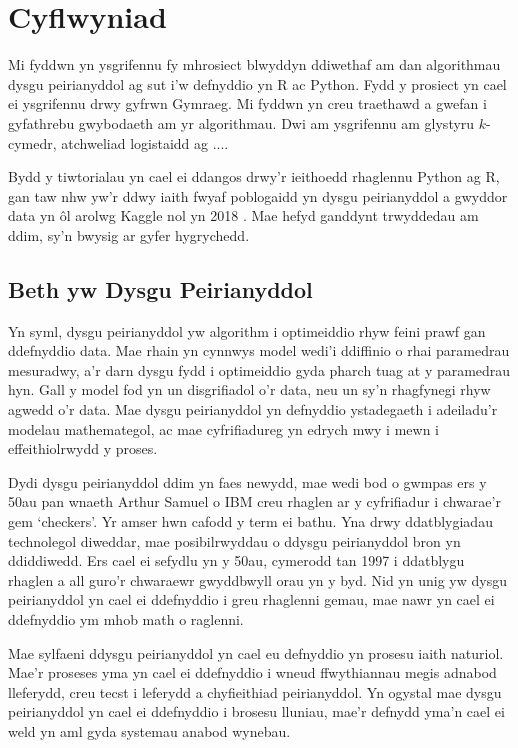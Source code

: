 \chapter{Cyflwyniad}\label{cha:introduction}

Mi fyddwn yn ysgrifennu fy mhrosiect blwyddyn ddiwethaf am dan algorithmau dysgu peirianyddol ag sut i'w defnyddio yn R ac Python. Fydd y prosiect yn cael ei ysgrifennu drwy gyfrwn Gymraeg. Mi fyddwn yn creu traethawd a gwefan i gyfathrebu gwybodaeth am yr algorithmau. Dwi am ysgrifennu am glystyru $k$-cymedr, atchweliad logistaidd ag ....

Bydd y tiwtorialau yn cael ei ddangos drwy'r ieithoedd rhaglennu Python ag R, gan taw nhw yw'r ddwy iaith fwyaf poblogaidd yn dysgu peirianyddol a gwyddor data yn \^{o}l arolwg Kaggle nol yn 2018 \cite{kagglesurvey}. Mae hefyd ganddynt trwyddedau am ddim, sy'n bwysig ar gyfer hygrychedd.

\section{Beth yw Dysgu Peirianyddol}\label{sec:intro_pd}

Yn syml, dysgu peirianyddol yw algorithm i optimeiddio rhyw feini prawf gan ddefnyddio data. Mae rhain yn cynnwys model wedi'i ddiffinio o rhai paramedrau mesuradwy, a'r darn dysgu fydd i optimeiddio gyda pharch tuag at y paramedrau hyn. Gall y model fod yn un disgrifiadol o'r data, neu un sy'n rhagfynegi rhyw agwedd o'r data. Mae dysgu peirianyddol yn defnyddio ystadegaeth i adeiladu'r modelau mathemategol, ac mae cyfrifiadureg yn edrych mwy i mewn i effeithiolrwydd y proses.\cite{dysgu-peirianyddol2}

Dydi dysgu peirianyddol ddim yn faes newydd, mae wedi bod o gwmpas ers y 50au pan wnaeth Arthur Samuel o IBM creu rhaglen ar y cyfrifiadur i chwarae'r gem `checkers'. Yr amser hwn cafodd y term ei bathu. Yna drwy ddatblygiadau technolegol diweddar, mae posibilrwyddau o ddysgu peirianyddol bron yn ddiddiwedd. Ers cael ei sefydlu yn y 50au, cymerodd tan 1997 i ddatblygu rhaglen a all guro'r chwaraewr gwyddbwyll orau yn y byd. Nid yn unig yw dysgu peirianyddol yn cael ei ddefnyddio i greu rhaglenni gemau, mae nawr yn cael ei ddefnyddio ym mhob math o raglenni. %

Mae sylfaeni ddysgu peirianyddol yn cael eu defnyddio yn prosesu iaith naturiol. Mae'r proseses yma yn cael ei ddefnyddio i wneud ffwythiannau megis adnabod lleferydd, creu tecst i leferydd a chyfieithiad peirianyddol.
Yn ogystal mae dysgu peirianyddol yn cael ei ddefnyddio i brosesu lluniau, mae'r defnydd yma'n cael ei weld yn aml gyda systemau anabod wynebau.

